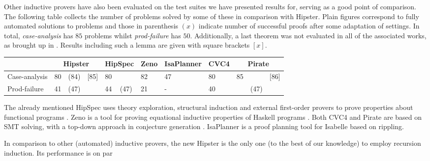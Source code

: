 Other inductive provers have also been evaluated on the test suites we have presented results for, serving as a good point of comparison.
%
The following table collects the number of problems solved by some of these in comparison with Hipster.
%
Plain figures correspond to fully automated solutions to problems and those in parenthesis $(x)$ indicate number of successful proofs after some adaptation of settings.
%
In total, \emph{case-analysis} has $85$ problems whilst \emph{prod-failure} has $50$.
%
Additionally, a last theorem was not evaluated in all of the associated works, as brought up in \cite{SPASSInduction}. Results including such a lemma are given with square brackets $[x]$.

\vspace{2 mm}

\begin{tabularx}{\textwidth}{l | X X X | X X | X | X | X | X X X}
  & \multicolumn{3}{|c|}{Hipster}
  	& \multicolumn{2}{c|}{HipSpec}
  	& \multicolumn{1}{c|}{Zeno}
  	& \multicolumn{1}{c|}{IsaPlanner}
  	& \multicolumn{1}{c|}{CVC4}
  	& \multicolumn{3}{c}{Pirate} \\
  \hline
  Case-analysis & 80 & (84) & [85] & 80 & & 82 & 47 & 80 & 85 & & [86] \\
  Prod-failure & 41 & (47) & & 44 & (47) & 21 & - & 40 & & (47) & \\
\end{tabularx}

\vspace{2 mm}

The already mentioned HipSpec uses theory exploration, structural induction and external first-order provers to prove properties about functional programs \cite{hipspecCADE}.
%
Zeno is a tool for proving equational inductive properties of Haskell programs \cite{zeno}.
%
Both CVC4 and Pirate are based on SMT solving, with a top-down approach in conjecture generation \cite{cvc4, SPASSInduction}.
%
IsaPlanner is a proof planning tool for Isabelle based on rippling.

In comparison to other (automated) inductive provers, the new Hipster is the only one (to the best of our knowledge) to employ recursion induction.
%
Its performance is on par 



